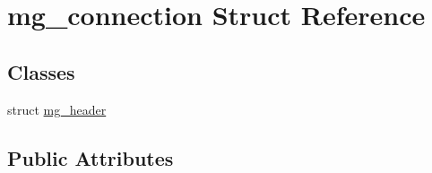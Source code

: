 \hypertarget{structmg__connection}{\section{mg\-\_\-connection Struct Reference}
\label{structmg__connection}
}
\subsection*{Classes}
\begin{DoxyCompactItemize}
\item 
struct \hyperlink{structmg__connection_1_1mg__header}{mg\-\_\-header}
\end{DoxyCompactItemize}
\subsection*{Public Attributes}
